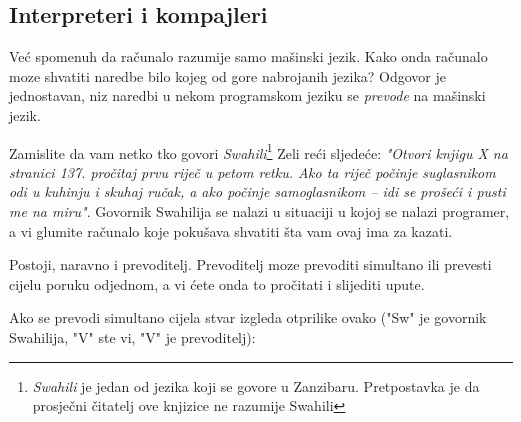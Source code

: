 \subsection{Interpreteri i kompajleri}

	Već spomenuh da računalo razumije samo mašinski jezik. Kako onda
	računalo moze shvatiti naredbe bilo kojeg od gore nabrojanih jezika?
	Odgovor je jednostavan, niz naredbi u nekom programskom jeziku se \emph{prevode} na
	mašinski jezik. 

	Zamislite da vam netko tko govori \emph{Swahili}\footnote{\emph{Swahili}
	je jedan od jezika koji se govore u Zanzibaru. Pretpostavka je da prosječni
	čitatelj ove knjizice ne razumije Swahili} Zeli reći sljedeće:
	\emph{"Otvori knjigu X na stranici 137. pročitaj prvu riječ u petom retku.
	Ako ta riječ počinje suglasnikom odi u kuhinju i skuhaj ručak, a ako
	počinje samoglasnikom -- idi se prošeći i pusti me na miru"}.
	Govornik Swahilija se nalazi u situaciji u kojoj se nalazi programer, a vi glumite
	računalo koje pokušava shvatiti šta vam ovaj ima za kazati. 
	
	Postoji, naravno i prevoditelj. Prevoditelj moze prevoditi simultano ili
	prevesti cijelu poruku odjednom, a vi ćete onda to pročitati i slijediti
	upute. 

	Ako se prevodi simultano cijela stvar izgleda otprilike ovako ("Sw" je govornik
	Swahilija, "V" ste vi, "V" je prevoditelj):

